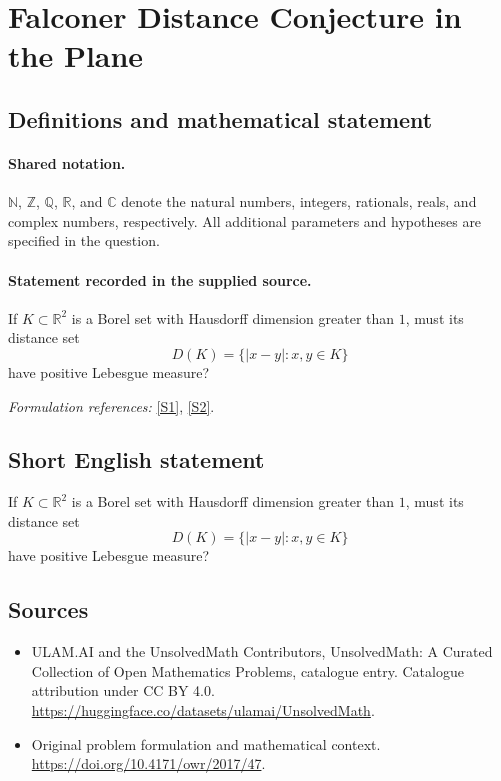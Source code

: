 \documentclass[11pt]{article}
\newcommand{\sref}[2]{\hyperlink{source:#1:#2}{[S#2]}}
\begin{document}
\section{Falconer Distance Conjecture in the Plane}\label{statement}

\subsection{Definitions and mathematical statement}

\paragraph{Shared notation.}$\mathbb N$, $\mathbb Z$, $\mathbb Q$, $\mathbb R$, and $\mathbb C$ denote the natural numbers, integers, rationals, reals, and complex numbers, respectively. All additional parameters and hypotheses are specified in the question.


\paragraph{Statement recorded in the supplied source.}
If $K\subset\mathbb R^2$ is a Borel set with Hausdorff dimension greater than $1$, must its distance set $$D(K)=\{|x-y|:x,y\in K\}$$ have positive Lebesgue measure?
\par\smallskip\textit{Formulation references:} \sref{statement}{1}, \sref{statement}{2}.
\subsection{Short English statement}
If $K\subset\mathbb R^2$ is a Borel set with Hausdorff dimension greater than $1$, must its distance set $$D(K)=\{|x-y|:x,y\in K\}$$ have positive Lebesgue measure?
\subsection{Sources}
\begin{itemize}
\item[\hypertarget{source:statement:1}{S1}] ULAM.AI and the UnsolvedMath Contributors, UnsolvedMath: A Curated Collection of Open Mathematics Problems, catalogue entry. Catalogue attribution under CC BY 4.0.
\url{https://huggingface.co/datasets/ulamai/UnsolvedMath}.
\item[\hypertarget{source:statement:2}{S2}] Original problem formulation and mathematical context.
\url{https://doi.org/10.4171/owr/2017/47}.
\end{itemize}
\label{end:statement}
\end{document}
